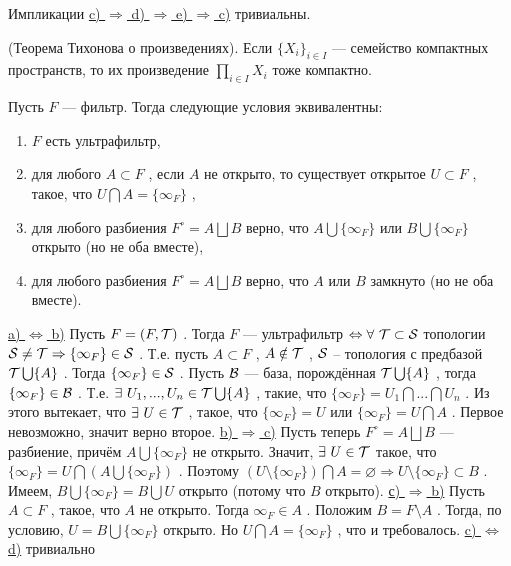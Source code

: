\vspace
Импликации \underline{c) \( \Rightarrow \) d) \( \Rightarrow \) e) \( \Rightarrow \) c)} тривиальны.

\SSendp

\SSsect[!!!] (Теорема Тихонова о произведениях).
Если \( \{X_i\}_{i \in I} \) --- семейство компактных пространств, то их произведение \( \underset{i \in I}{\prod} X_i \) тоже компактно.

\pagebreak

\SSbullet 

\SSsect Пусть \( F \) --- фильтр. Тогда следующие условия эквивалентны:
\begin{enumerate}[label={\alph*)}]
\item \( F \) есть ультрафильтр,
\item для любого \( A \subset F \) , если \( A \) не открыто, то существует открытое \( U \subset F \) , такое, что \( U \bigcap A = \{\infty_F\} \) ,
\item для любого разбиения \( F^{\circ} = A \bigsqcup B \) верно, что \( A \bigcup \{\infty_F\} \) или \( B \bigcup \{\infty_F\} \) открыто (но не оба вместе),
\item для любого разбиения \( F^{\circ} = A \bigsqcup B \) верно, что \( A \) или \( B \) замкнуто (но не оба вместе).
\end{enumerate}

\SSproof

\underline{a) \( \Leftrightarrow \) b)}
\vspace
Пусть \( F = (F,\mathcal{T}) \) . Тогда \( F \) --- ультрафильтр \( \Leftrightarrow \forall~ \mathcal{T} \subset \mathcal{S} \) топологии \( \mathcal{S} \neq \mathcal{T} \Rightarrow \{\infty_F\} \in \mathcal{S} \) . Т.е. пусть \( A \subset F \) , \( A \notin \mathcal{T} \) , \( \mathcal{S} \) -- топология с предбазой \( \mathcal{T} \bigcup \{A\} \) . Тогда \( \{\infty_F\} \in \mathcal{S} \) . Пусть \( \mathcal{B} \) --- база, порождённая \( \mathcal{T} \bigcup \{A\} \) , тогда \( \{\infty_F\} \in \mathcal{B} \) . Т.е. \( \exists~U_1,...,U_n \in \mathcal{T} \bigcup \{A\} \) , такие, что \( \{\infty_F\} = U_1\bigcap ... \bigcap U_n \) . Из этого вытекает, что \( \exists~U \in \mathcal{T} \) , такое, что \( \{\infty_F\} = U \) или \( \{\infty_F\} = U \bigcap A \) . Первое невозможно, значит верно второе.
\vspace
\underline{b) \( \Rightarrow \) c)}
\vspace
Пусть теперь \( F^{\circ} = A \bigsqcup B \) --- разбиение, причём \( A \bigcup \{\infty_F\} \) не открыто. Значит, \( \exists~ U \in \mathcal{T} \) такое, что \( \{\infty_F\} = U \bigcap (A \bigcup \{\infty_F\}) \) . Поэтому \( (U \setminus \{\infty_F\}) \bigcap A = \varnothing \Rightarrow U \setminus \{\infty_F\} \subset B \) . Имеем, \( B \bigcup \{\infty_F\} = B \bigcup U \) открыто (потому что \( B \) открыто).
\vspace
\underline{с) \( \Rightarrow \) b)}
\vspace
Пусть \( A \subset F \) , такое, что \( A \) не открыто. Тогда \( \infty_F \in A \) . Положим \( B = F \setminus A \) . Тогда, по условию, \( U = B \bigcup \{\infty_F\} \) открыто. Но \( U \bigcap A = \{\infty_F\} \) , что и требовалось.
\vspace
\underline{c) \( \Leftrightarrow \) d)} тривиально

